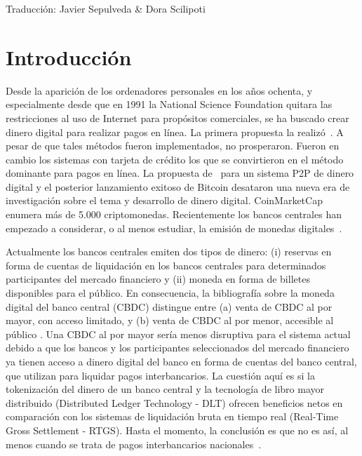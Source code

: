 \documentclass[10pt,spanish]{article}
\begin{document}
Traducción: Javier Sepulveda \& Dora Scilipoti


\newpage
\hypertarget{introducciuxf3n}{%
\section{Introducción}
\label{1.-introducciuxf3n}}

Desde la aparición de los ordenadores personales en los años ochenta, y
especialmente desde que en 1991 la National Science Foundation quitara
las restricciones al uso de Internet para propósitos comerciales, se ha
buscado crear dinero digital para realizar pagos en línea. La primera
propuesta la realizó~\citet{Chaum1983}. A pesar de que tales métodos fueron
implementados, no prosperaron. Fueron en cambio los sistemas con tarjeta
de crédito los que se convirtieron en el método dominante para pagos en
línea. La propuesta de~\citet{Nakamoto} para un sistema P2P de dinero
digital y el posterior lanzamiento exitoso de Bitcoin desataron una
nueva era de investigación sobre el tema y desarrollo de dinero digital.
CoinMarketCap enumera más de 5.000 criptomonedas. Recientemente los
bancos centrales han empezado a considerar, o al menos estudiar, la
emisión de monedas digitales~\cite[véase][]{AuerBoehme,AuerCornelli,Boar,Kiff,Mancini-Griffoli}.

Actualmente los bancos centrales emiten dos tipos de dinero: (i)
reservas en forma de cuentas de liquidación en los bancos centrales para
determinados participantes del mercado financiero y (ii) moneda en forma
de billetes disponibles para el público. En consecuencia, la
bibliografía sobre la moneda digital del banco central (CBDC) distingue
entre (a) venta de CBDC al por mayor, con acceso limitado, y (b) venta
de CBDC al por menor, accesible al público \cite[véase, p. ej.][]{Bech}.
Una CBDC al por mayor sería menos disruptiva para el sistema
actual debido a que los bancos y los participantes seleccionados del
mercado financiero ya tienen acceso a dinero digital del banco en forma
de cuentas del banco central, que utilizan para liquidar pagos
interbancarios. La cuestión aquí es si la tokenización del dinero de un
banco central y la tecnología de libro mayor distribuido (Distributed
Ledger Technology - DLT) ofrecen beneficios netos en comparación con los
sistemas de liquidación bruta en tiempo real (Real-Time Gross
Settlement - RTGS). Hasta el momento, la conclusión es que no es así, al
menos cuando se trata de pagos interbancarios nacionales~\cite[véase][]{Chapman}.
\end{document}

